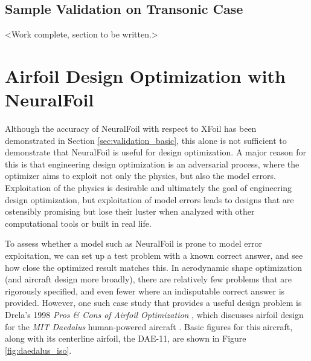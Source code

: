 \documentclass[conf]{new-aiaa}
\begin{document}
\begin{table}[h]

    \end{table}

    \subsection{Sample Validation on Transonic Case}
    \label{sec:validation_transonic}

    <Work complete, section to be written.>


    \section{Airfoil Design Optimization with NeuralFoil}

    Although the accuracy of NeuralFoil with respect to XFoil has been demonstrated in Section \ref{sec:validation_basic}, this alone is not sufficient to demonstrate that NeuralFoil is useful for design optimization. A major reason for this is that engineering design optimization is an adversarial process, where the optimizer aims to exploit not only the physics, but also the model errors. Exploitation of the physics is desirable and ultimately the goal of engineering design optimization, but exploitation of model errors leads to designs that are ostensibly promising but lose their luster when analyzed with other computational tools or built in real life.

    To assess whether a model such as NeuralFoil is prone to model error exploitation, we can set up a test problem with a known correct answer, and see how close the optimized result matches this. In aerodynamic shape optimization (and aircraft design more broadly), there are relatively few problems that are rigorously specified, and even fewer where an indisputable correct answer is provided. However, one such case study that provides a useful design problem is Drela's 1998 \textit{Pros \& Cons of Airfoil Optimization} \cite{drela_pros_1998}, which discusses airfoil design for the \emph{MIT Daedalus} human-powered aircraft \cite{langford_feasibility_1986, langford_daedalus_1989, drela_humanpowered_1985}. Basic figures for this aircraft, along with its centerline airfoil, the DAE-11, are shown in Figure \ref{fig:daedalus_iso}.
\end{document}
